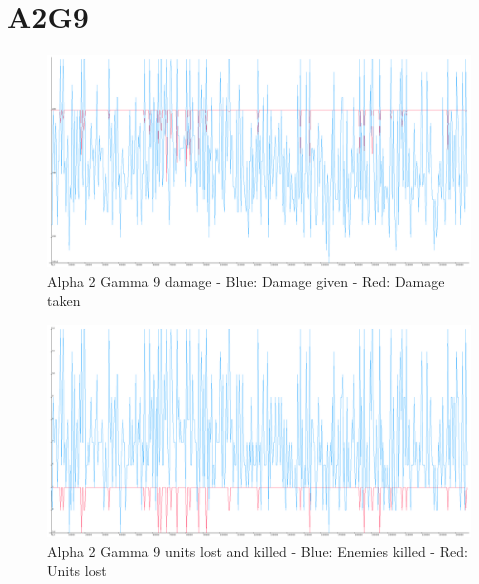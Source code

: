 \section{A2G9}
\begin{figure}[H]
\includegraphics[angle=-90, scale=0.25]{Figures/learningrate/A2G9/damage.png}
\caption{Alpha 2 Gamma 9 damage - Blue: Damage given - Red: Damage taken}
\label{fig:app_a2g9_damage}
\end{figure}	

\begin{figure}[H]
\includegraphics[angle=-90, scale=0.25]{Figures/learningrate/A2G9/units_lost_and_units_killed.png}
\caption{Alpha 2 Gamma 9 units lost and killed - Blue: Enemies killed - Red: Units lost}
\label{fig:app_a2g9_lak}
\end{figure}	

\newpage
